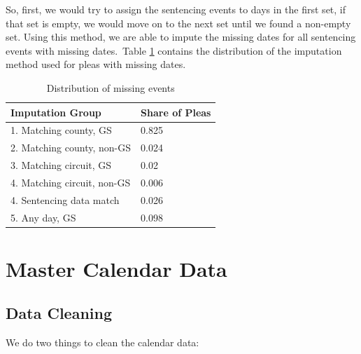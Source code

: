 \documentclass[11pt, oneside]{article}   	%
\theoremstyle{ModifiedStyle}
\begin{document}
      So, first, we would try to assign the sentencing events to days in the first set, if that set is empty, we would move on to the next set until we found a non-empty set. Using this method, we are able to impute the missing dates for all sentencing events with missing dates. Table \ref{tab:imp} contains the distribution of the imputation method used for pleas with missing dates.

      \begin{table}[H]
          \centering
          \caption{Distribution of missing events}
          \label{tab:imp}
          \begin{tabular}{|l|l|}
          \hline
          \textbf{Imputation Group}   & \textbf{Share of Pleas} \\ \hline
          1. Matching county, GS      & 0.825                   \\ \hline
          2. Matching county, non-GS  & 0.024                   \\ \hline
          3. Matching circuit, GS     & 0.02                    \\ \hline
          4. Matching circuit, non-GS & 0.006                   \\ \hline
          4. Sentencing data match & 0.026 \\ \hline
          5. Any day, GS              & 0.098                    \\ \hline
          \end{tabular}
      \end{table}

\section{Master Calendar Data}
  \label{Appendix:Master_Calendar}
  \subsection{Data Cleaning}
    We do two things to clean the calendar data:
\end{document}
